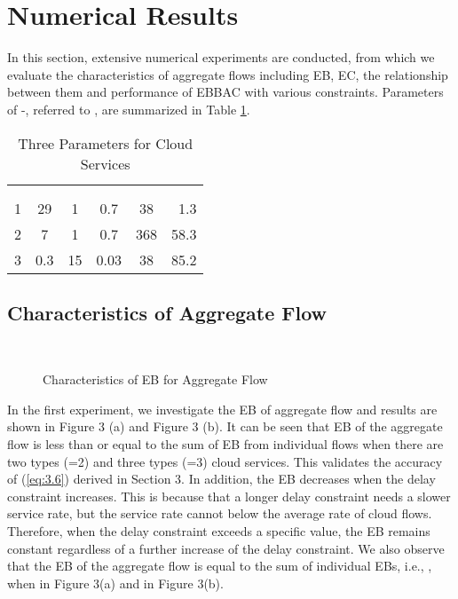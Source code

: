 \documentclass[a4paper]{article}
\begin{document}
\section{Numerical Results}

In this section, extensive numerical experiments are conducted, from which we evaluate the characteristics of aggregate flows including EB, EC, the relationship between them and performance of EBBAC with various constraints. Parameters of -, referred to \cite{le2001}, are summarized in Table \ref{tab1}.

\begin{table}[htbp]
 \centering
 \caption{\label{tab:test}Three Parameters for Cloud Services}

 \begin{tabular}{lccccr}
  \toprule  &  &  &  &  &  \\\cline{2-6}
           &  &  &  &  &  \\
  \midrule 1 & 29 & 1 & 0.7 & 38 & 1.3 \\
           2 & 7 & 1 & 0.7 & 368 & 58.3 \\
           3 & 0.3 & 15 & 0.03 & 38 & 85.2 \\
  \bottomrule
 \end{tabular}
 \label{tab1}
\end{table}

\subsection{Characteristics of Aggregate Flow}

\begin{figure}[h]
  \centering
  \\
  \caption{Characteristics of EB for Aggregate Flow}
  \label{fig3}
\end{figure}

In the first experiment, we investigate the EB of aggregate flow and results are shown in Figure 3 (a) and Figure 3 (b). It can be seen that EB of the aggregate flow is less than or equal to the sum of EB from individual flows when there are two types (=2) and three types (=3) cloud services. This validates the accuracy of (\ref{eq:3.6}) derived in Section 3. In addition, the EB decreases when the delay constraint  increases. This is because that a longer delay constraint needs a slower service rate, but the service rate cannot below the average rate of cloud flows. Therefore, when the delay constraint exceeds a specific value, the EB remains constant regardless of a further increase of the delay constraint. We also observe that the EB of the aggregate flow is equal to the sum of individual EBs, i.e., , when  in Figure 3(a) and  in Figure 3(b).
\end{document}
